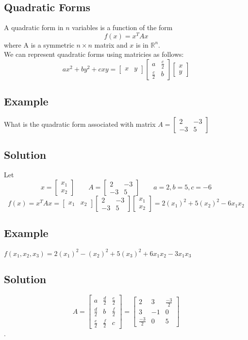 \subsection*{Quadratic Forms}
A quadratic form in $n$ variables is a function of the form
$$f(x) = x^TAx$$
where A is a symmetric $n\times n$ matrix and $x$ is in $\mathbb{R}^n$.\\
We can represent quadratic forms using matricies as follows:
$$ax^2 + by^2 + cxy = \begin{bmatrix}
    x&y
\end{bmatrix}\begin{bmatrix}
    a&\frac{c}{2}\\\frac{c}{2}&b
\end{bmatrix}\begin{bmatrix}
    x\\y
\end{bmatrix}$$

\subsection*{Example}
What is the quadratic form associated with matrix $A = \begin{bmatrix}
    2&-3\\-3&5
\end{bmatrix}$
\subsection*{Solution}
Let $$x = \begin{bmatrix}
    x_1\\x_2
\end{bmatrix}\qquad A = \begin{bmatrix}
    2&-3\\-3&5
\end{bmatrix}\qquad a=2,b=5,c=-6$$
$$f(x) = x^TAx = \begin{bmatrix}
    x_1&x_2
\end{bmatrix}\begin{bmatrix}
    2&-3\\-3&5
\end{bmatrix}\begin{bmatrix}
    x_1\\x_2
\end{bmatrix} = 2(x_1)^2 + 5(x_2)^2 - 6x_1x_2$$

\subsection*{Example}
$f(x_1, x_2, x_3) = 2(x_1)^2 - (x_2)^2 + 5(x_3)^2 + 6x_1x_2 - 3x_1x_3$
\subsection*{Solution}
$$A = \begin{bmatrix}
    a&\frac{d}{2}&\frac{e}{2}\\
    \frac{d}{2}&b&\frac{f}{2}\\
    \frac{e}{2}&\frac{f}{2}&c
\end{bmatrix} = \begin{bmatrix}
    2&3&\frac{-3}{2}\\
    3&-1&0\\
    \frac{-3}{2}&0&5
\end{bmatrix}$$.